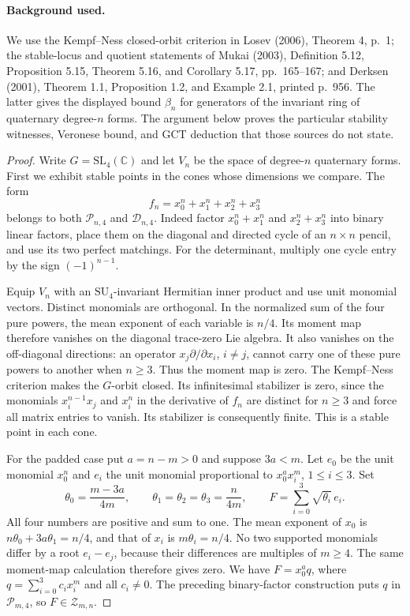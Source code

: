 \documentclass[11pt,a4paper]{article}
\theoremstyle{definition}\newtheorem{definition}{Definition}
\begin{document}
\paragraph{Background used.}
We use the Kempf--Ness closed-orbit criterion in Losev (2006),
Theorem 4, p.~1; the stable-locus and quotient statements of
Mukai (2003), Definition 5.12, Proposition 5.15, Theorem 5.16,
and Corollary 5.17, pp.~165--167; and Derksen (2001),
Theorem 1.1, Proposition 1.2, and Example 2.1, printed p.~956.
The latter gives the displayed bound $\beta_n$ for generators
of the invariant ring of quaternary degree-$n$ forms.
The argument below proves the particular stability witnesses,
Veronese bound, and GCT deduction that those sources do not state.
\begin{proof}
Write $G=\mathrm{SL}_4(\mathbb C)$ and let $V_n$ be the space
of degree-$n$ quaternary forms. First we exhibit stable points
in the cones whose dimensions we compare. The form
\[
 f_n=x_0^n+x_1^n+x_2^n+x_3^n
\]
belongs to both $\mathcal P_{n,4}$ and $\mathcal D_{n,4}$.
Indeed factor $x_0^n+x_1^n$ and $x_2^n+x_3^n$ into binary
linear factors, place them on the diagonal and directed cycle
of an $n\times n$ pencil, and use its two perfect matchings.
For the determinant, multiply one cycle entry by the sign
$(-1)^{n-1}$.

Equip $V_n$ with an $\mathrm{SU}_4$-invariant Hermitian inner
product and use unit monomial vectors. Distinct monomials are
orthogonal. In the normalized sum of the four pure powers,
the mean exponent of each variable is $n/4$. Its moment map
therefore vanishes on the diagonal trace-zero Lie algebra.
It also vanishes on the off-diagonal directions: an operator
$x_j\partial/\partial x_i$, $i\ne j$, cannot carry one of
these pure powers to another when $n\geq3$. Thus the moment
map is zero. The Kempf--Ness criterion makes the $G$-orbit
closed. Its infinitesimal stabilizer is zero, since the
monomials $x_i^{n-1}x_j$ and $x_i^n$ in the derivative of
$f_n$ are distinct for $n\geq3$ and force all matrix entries
to vanish. Its stabilizer is consequently finite. This is a
stable point in each cone.

For the padded case put $a=n-m>0$ and suppose $3a<m$.
Let $e_0$ be the unit monomial $x_0^n$ and $e_i$ the unit
monomial proportional to $x_0^a x_i^m$, $1\leq i\leq3$.
Set
\[
 \theta_0=\frac{m-3a}{4m},\qquad
 \theta_1=\theta_2=\theta_3=\frac{n}{4m},\qquad
 F=\sum_{i=0}^3\sqrt{\theta_i}\,e_i.
\]
All four numbers are positive and sum to one. The mean
exponent of $x_0$ is $n\theta_0+3a\theta_1=n/4$, and
that of $x_i$ is $m\theta_i=n/4$. No two supported monomials
differ by a root $e_i-e_j$, because their differences are
multiples of $m\geq4$. The same moment-map calculation
therefore gives zero. We have $F=x_0^a q$, where
$q=\sum_{i=0}^3 c_i x_i^m$ and all $c_i\ne0$.
The preceding binary-factor construction puts $q$ in
$\mathcal P_{m,4}$, so $F\in\mathcal Z_{m,n}$.


\end{proof}
\end{document}
